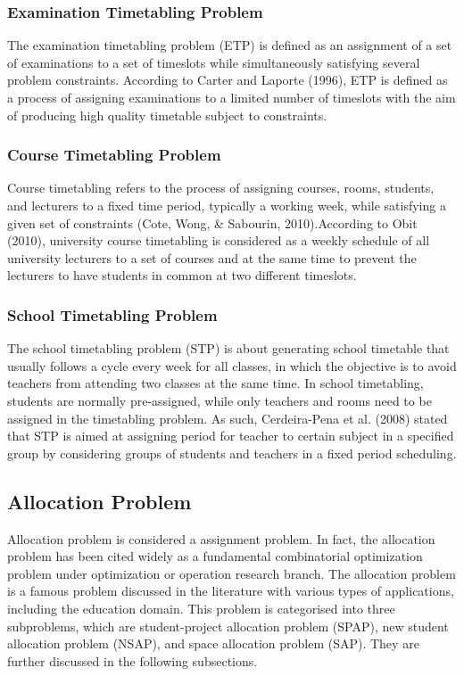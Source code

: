 \documentclass[11pt]{report}
\begin{document}
	\subsubsection{Examination Timetabling Problem}
	The examination timetabling problem (ETP) is defined as an assignment of a set of examinations to a set of timeslots while simultaneously satisfying several problem constraints. According to Carter and Laporte (1996), ETP is defined as a process of assigning examinations to a limited number of timeslots with the aim of producing high quality timetable subject to constraints.
	
	\subsubsection{Course Timetabling Problem}
	Course timetabling refers to the process of assigning courses, rooms, students, and lecturers to a fixed time period, typically a working week, while satisfying a given set of constraints (Cote, Wong, \& Sabourin, 2010).According to Obit (2010), university course timetabling is considered
	as a weekly schedule of all university lecturers to a set of courses and at the same time to prevent the lecturers to have students in common at two different timeslots.
	
	\subsubsection{School Timetabling Problem}
	The school timetabling problem (STP) is about generating school timetable that usually follows a cycle every week for all classes, in which the objective is to avoid teachers from attending two classes at the same time. In school timetabling, students are normally pre-assigned, while only teachers and rooms need to be assigned in the timetabling problem. As such, Cerdeira-Pena et al. (2008) stated that STP is aimed at assigning period for teacher to certain subject in a specified group by considering groups of students and teachers in a fixed period scheduling.
	
	\subsection{Allocation Problem}
	Allocation problem is considered a assignment problem. In fact, the allocation problem has been cited widely as a fundamental combinatorial optimization problem under optimization or operation research branch. The allocation problem is a famous problem discussed in the literature with
	various types of applications, including the education domain. This problem is categorised into three subproblems, which are student-project allocation problem (SPAP), new student allocation problem (NSAP), and space allocation problem (SAP). They are further discussed in the following
	subsections.
	
\end{document}
